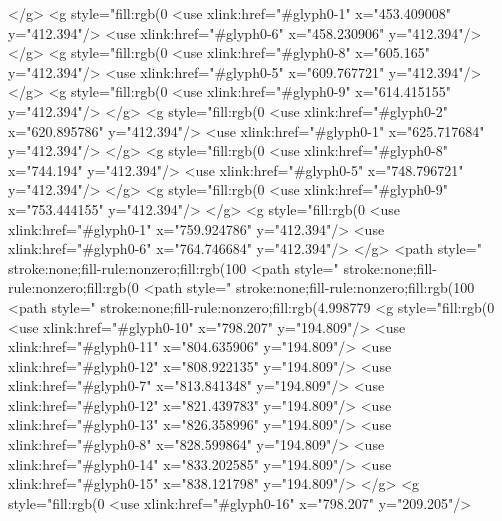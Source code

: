 </g>
<g style="fill:rgb(0%
  <use xlink:href="#glyph0-1" x="453.409008" y="412.394"/>
  <use xlink:href="#glyph0-6" x="458.230906" y="412.394"/>
</g>
<g style="fill:rgb(0%
  <use xlink:href="#glyph0-8" x="605.165" y="412.394"/>
  <use xlink:href="#glyph0-5" x="609.767721" y="412.394"/>
</g>
<g style="fill:rgb(0%
  <use xlink:href="#glyph0-9" x="614.415155" y="412.394"/>
</g>
<g style="fill:rgb(0%
  <use xlink:href="#glyph0-2" x="620.895786" y="412.394"/>
  <use xlink:href="#glyph0-1" x="625.717684" y="412.394"/>
</g>
<g style="fill:rgb(0%
  <use xlink:href="#glyph0-8" x="744.194" y="412.394"/>
  <use xlink:href="#glyph0-5" x="748.796721" y="412.394"/>
</g>
<g style="fill:rgb(0%
  <use xlink:href="#glyph0-9" x="753.444155" y="412.394"/>
</g>
<g style="fill:rgb(0%
  <use xlink:href="#glyph0-1" x="759.924786" y="412.394"/>
  <use xlink:href="#glyph0-6" x="764.746684" y="412.394"/>
</g>
<path style=" stroke:none;fill-rule:nonzero;fill:rgb(100%
<path style=" stroke:none;fill-rule:nonzero;fill:rgb(0%
<path style=" stroke:none;fill-rule:nonzero;fill:rgb(100%
<path style=" stroke:none;fill-rule:nonzero;fill:rgb(4.998779%
<g style="fill:rgb(0%
  <use xlink:href="#glyph0-10" x="798.207" y="194.809"/>
  <use xlink:href="#glyph0-11" x="804.635906" y="194.809"/>
  <use xlink:href="#glyph0-12" x="808.922135" y="194.809"/>
  <use xlink:href="#glyph0-7" x="813.841348" y="194.809"/>
  <use xlink:href="#glyph0-12" x="821.439783" y="194.809"/>
  <use xlink:href="#glyph0-13" x="826.358996" y="194.809"/>
  <use xlink:href="#glyph0-8" x="828.599864" y="194.809"/>
  <use xlink:href="#glyph0-14" x="833.202585" y="194.809"/>
  <use xlink:href="#glyph0-15" x="838.121798" y="194.809"/>
</g>
<g style="fill:rgb(0%
  <use xlink:href="#glyph0-16" x="798.207" y="209.205"/>
